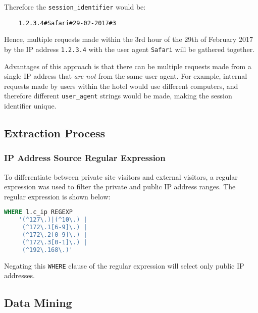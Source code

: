 Therefore the \texttt{session\_identifier} would be:

\begin{lstlisting}
    1.2.3.4#Safari#29-02-2017#3
\end{lstlisting}

Hence, multiple requests made within the 3rd hour of the 29th of February 2017 by the IP address \texttt{1.2.3.4} with the user agent \texttt{Safari} will be gathered together.

Advantages of this approach is that there can be multiple requests made from a single IP address that \textit{are not} from the same user agent. For example, internal requests made by users within the hotel would use different computers, and therefore different \texttt{user\_agent} strings would be made, making the session identifier unique.

\subsection{Extraction Process}

\subsubsection{IP Address Source Regular Expression}

To differentiate between private site visitors and external visitors, a regular expression was used to filter the private and public IP address ranges. The regular expression is shown below:

\begin{lstlisting}[language=SQL, xleftmargin=2cm]
WHERE l.c_ip REGEXP 
	'(^127\.)|(^10\.) | 
	 (^172\.1[6-9]\.) |
	 (^172\.2[0-9]\.) |
	 (^172\.3[0-1]\.) |
	 (^192\.168\.)'
\end{lstlisting}

Negating this \texttt{WHERE} clause of the regular expression will select only public IP addresses.

\subsection{Data Mining}